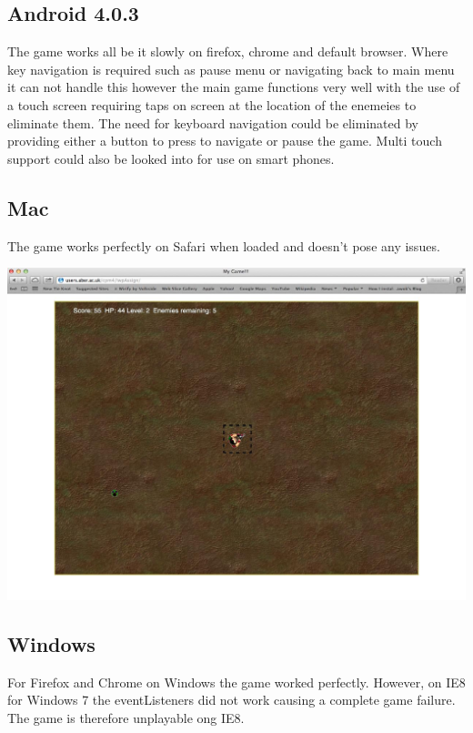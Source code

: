 \documentclass{article}
\begin{document}
\subsection{Android 4.0.3}
The game works all be it slowly on firefox, chrome and default browser. Where key navigation is required such as pause menu or navigating back to main menu it can not handle this however the main game functions very well with the use of a touch screen requiring taps on screen at the location of the enemeies to eliminate them. The need for keyboard navigation could be eliminated by providing either a button to press to navigate or pause the game. Multi touch support could also be looked into for use on smart phones.

\subsection{Mac}
The game works perfectly on Safari when loaded and doesn't pose any issues.

\includegraphics[scale=0.2]{mac.jpg}

\subsection{Windows}
For Firefox and Chrome on Windows the game worked perfectly. However, on IE8 for Windows 7 the eventListeners did not work causing a complete game failure. The game is therefore unplayable ong IE8. 
\end{document}
